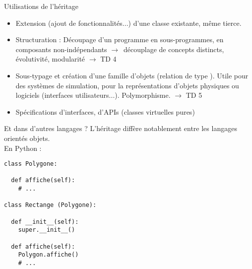 \documentclass[c]{beamer}
\begin{document}

\begin{frame}{Utilisations de l'héritage}
\begin{itemize}

\item Extension (ajout de fonctionnalités...) d'une classe existante, même tierce.

\item Structuration : Découpage d'un programme en sous-programmes, en composants non-indépendants $\to$~découplage de concepts distincts, évolutivité, modularité $\to$ TD 4

\item Sous-typage et création d'une famille d'objets (relation de type ). Utile pour des systèmes de simulation, pour la représentations d'objets physiques ou logiciels (interfaces utilisateurs...). Polymorphisme. $\to$ TD 5

\item Spécifications d'interfaces, d'APIs (classes virtuelles pures)

\end{itemize}
\end{frame}


\begin{frame}[fragile]{Et dans d'autres langages ?}
L'héritage diffère notablement entre les langages orientés objets.\\

En Python :
\begin{verbatim}
class Polygone:

  def affiche(self):
    # ...

class Rectange (Polygone):

  def __init__(self):
    super.__init__()

  def affiche(self):
    Polygon.affiche()
    # ...
\end{verbatim}
\end{frame}
\end{document}
